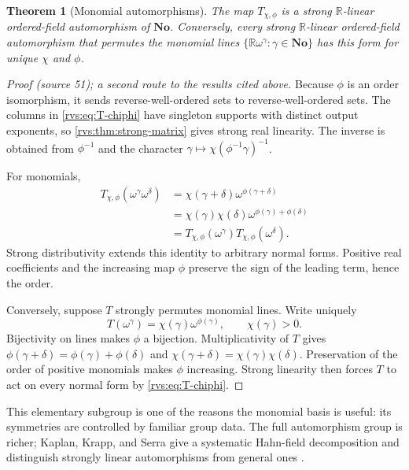 \documentclass[11pt,letterpaper]{article}
\numberwithin{equation}{section}
\newtheorem{theorem}{Theorem}[section]
\theoremstyle{definition}
\theoremstyle{remark}
\newcommand{\No}{\mathbf{No}}
\newcommand{\R}{\mathbb{R}}
\begin{document}
\begin{theorem}[Monomial automorphisms]\label{rvs:thm:monomial-aut}
The map \(T_{\chi,\phi}\) is a strong \(\R\)-linear ordered-field
automorphism of \(\No\).  Conversely, every strong \(\R\)-linear
ordered-field automorphism that permutes the monomial lines
\(\{\R\omega^\gamma:\gamma\in\No\}\) has this form for unique
\(\chi\) and \(\phi\).
\end{theorem}

\begin{proof}[Proof (source 51); a second route to the results cited above]
Because \(\phi\) is an order isomorphism, it sends reverse-well-ordered sets
to reverse-well-ordered sets.  The columns in \eqref{rvs:eq:T-chiphi} have
singleton supports with distinct output exponents, so
\cref{rvs:thm:strong-matrix} gives strong real linearity.  The inverse is obtained
from \(\phi^{-1}\) and the character
\(\gamma\mapsto\chi(\phi^{-1}\gamma)^{-1}\).

For monomials,
\begin{align*}
 T_{\chi,\phi}(\omega^\gamma\omega^\delta)
 &=\chi(\gamma+\delta)\omega^{\phi(\gamma+\delta)}\\
 &=\chi(\gamma)\chi(\delta)
   \omega^{\phi(\gamma)+\phi(\delta)}\\
 &=T_{\chi,\phi}(\omega^\gamma)
   T_{\chi,\phi}(\omega^\delta).
\end{align*}
Strong distributivity extends this identity to arbitrary normal forms.
Positive real coefficients and the increasing map \(\phi\) preserve the sign
of the leading term, hence the order.

Conversely, suppose \(T\) strongly permutes monomial lines.  Write uniquely
\[
  T(\omega^\gamma)=\chi(\gamma)\omega^{\phi(\gamma)},
  \qquad \chi(\gamma)>0.
\]
Bijectivity on lines makes \(\phi\) a bijection.  Multiplicativity of \(T\)
gives
\(\phi(\gamma+\delta)=\phi(\gamma)+\phi(\delta)\) and
\(\chi(\gamma+\delta)=\chi(\gamma)\chi(\delta)\).  Preservation of the order
of positive monomials makes \(\phi\) increasing.  Strong linearity then
forces \(T\) to act on every normal form by \eqref{rvs:eq:T-chiphi}.
\end{proof}

This elementary subgroup is one of the reasons the monomial basis is useful:
its symmetries are controlled by familiar group data.  The full automorphism
group is richer; Kaplan, Krapp, and Serra give a systematic Hahn-field
decomposition and distinguish strongly linear automorphisms from general
ones \cite{KKS}.
\end{document}
